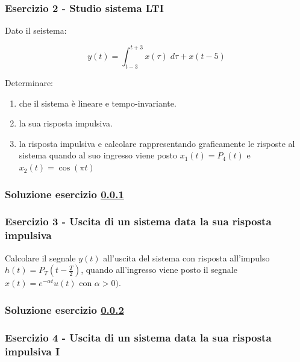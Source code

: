 \documentclass[../main.tex]{subfiles}
\begin{document}
\vspace*{1.5cm}
\subsubsection{Esercizio 2 - Studio sistema LTI}
\label{ss32}

Dato il seistema:

\begin{equation*}
	y(t) = \int_{t-3}^{t+3} x(\tau) \; d\tau + x(t-5)
\end{equation*}

Determinare:

\begin{enumerate}
	\item che il sistema è lineare e tempo-invariante.
	\item la sua risposta impulsiva.
	\item la risposta impulsiva e calcolare rappresentando graficamente le risposte al sistema quando al suo ingresso viene posto $x_1(t) = P_4(t)$ e $x_2(t) = \cos(\pi t)$
\end{enumerate}

\subsubsection*{Soluzione esercizio \ref{ss32}}



\vspace*{1.5cm}
\subsubsection{Esercizio 3 - Uscita di un sistema data la sua risposta impulsiva}
\label{ss33}

Calcolare il segnale $y(t)$ all’uscita del sistema con risposta all’impulso $h(t) = P_T(t - \frac{T}{2})$, quando all'ingresso viene posto il segnale $x(t) = e^{-\alpha t } u(t)$ con $\alpha > 0)$. 


\subsubsection*{Soluzione esercizio \ref{ss33}}


\vspace*{1.5cm}
\subsubsection{Esercizio 4 - Uscita di un sistema data la sua risposta impulsiva I}
\label{ss34}
\end{document}
